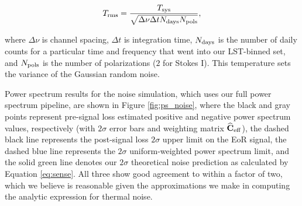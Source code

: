 \documentclass[preprint2,numberedappendix,tighten]{aastex6}
\begin{document}
\begin{equation}
\label{eq:noise}
T_{\rm rms} = \frac{T_{\rm sys}}{\sqrt{\Delta\nu \Delta t N_{\rm days} N_{\rm pols}}},
\end{equation}

\noindent where $\Delta\nu$ is channel spacing, $\Delta t$ is integration time, $N_{\rm days}$ is the number of daily counts for a 
particular time and frequency that went into our LST-binned set, and $N_{\rm pols}$ is the number of polarizations ($2$ for Stokes 
I). This temperature sets the variance of the Gaussian random noise.

Power spectrum results for the noise simulation, which uses our full power spectrum pipeline, are shown in Figure 
\ref{fig:ps_noise}, where the black and gray points represent pre-signal loss estimated positive and negative power spectrum values, respectively (with 
$2\sigma$ error bars and weighting matrix $\widehat{\textbf{C}}_{\rm eff}$), the dashed black line represents the post-signal loss $2\sigma$ upper limit on the EoR signal, the dashed blue line represents the $2\sigma$ uniform-weighted power 
spectrum limit, and the solid green line denotes our $2\sigma$ theoretical noise prediction as calculated by Equation 
\eqref{eq:sense}. All three show good agreement to within a factor of two, which we believe is reasonable given the approximations we make in computing the analytic expression for thermal noise.
\end{document}
